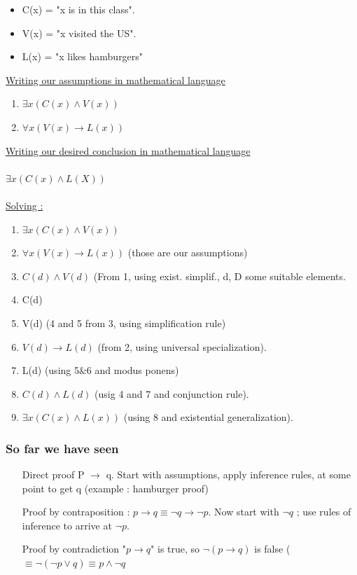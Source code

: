 \documentclass[12pt,a4paper]{article}
\begin{document}
\begin{itemize}
	\item C(x) = "x is in this class".
	\item V(x) = "x visited the US".
	\item L(x) = "x likes hamburgers"
\end{itemize}
\underline{Writing our assumptions in mathematical language}
\begin{enumerate}
	\item $\exists x (C(x) \wedge V(x))$
	\item $\forall x ( V(x) \rightarrow L(x))$
\end{enumerate}
\underline{Writing our desired conclusion in mathematical language}\\
\\
$\exists x (C(x) \wedge L(X))$\\
\\
\underline{Solving :}
\begin{enumerate}
	\item $\exists x (C(x) \wedge V(x))$
	\item $\forall x ( V(x) \rightarrow L(x))$ (those are our assumptions)
	\item $C(d) \wedge V(d)$ (From 1, using exist. simplif., d, D some suitable elements.
	\item C(d)
	\item V(d) (4 and 5 from 3, using simplification rule)
	\item $V(d) \rightarrow L(d)$ (from 2, using universal specialization).
	\item L(d) (using 5\&6 and modus ponens)
	\item $C(d) \wedge L(d)$ (usig 4 and 7 and conjunction rule).
	\item $\exists x (C(x) \wedge L(x))$ (using 8 and existential generalization).
\end{enumerate}

\subsubsection{So far we have seen}
\begin{enumerate}
	\item[Direct proof] P $\rightarrow$ q. Start with assumptions, apply inference rules, at some point to get q (example : hamburger proof)
	\item[Proof by contraposition :] $p \rightarrow q \equiv \neg q \rightarrow \neg p$. Now start with $\neg q$ ; use rules of inference to arrive at $\neg p$.
	\item[Proof by contradiction] "$p \rightarrow q$" is true, so $\neg (p \rightarrow q)$ is false ($\equiv \neg (\neg p \vee q) \equiv p \wedge \neg q$
\end{enumerate}
\end{document}
